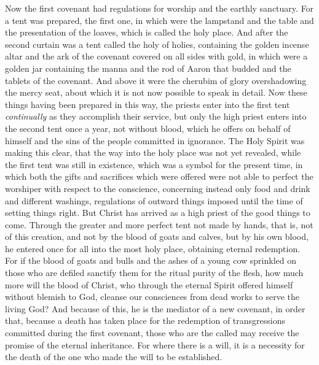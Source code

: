 \begin{biblechapter} %
 Now the first covenant had regulations for worship and the earthly sanctuary.
\verse For a tent was prepared, the first one, in which were the lampstand and the table and the presentation of the loaves, which is called the holy place.
\verse And after the second curtain was a tent called the holy of holies,
\verse containing the golden incense altar and the ark of the covenant covered on all sides with gold, in which were a golden jar containing the manna and the rod of Aaron that budded and the tablets of the covenant.
\verse And above it were the cherubim of glory overshadowing the mercy seat, about which it is not now possible to speak in detail.
\verse Now these things having been prepared in this way, the priests enter into the first tent \textit{continually} as they accomplish their service,
\verse but only the high priest enters into the second tent once a year, not without blood, which he offers on behalf of himself and the sins of the people committed in ignorance.
\verse The Holy Spirit was making this clear, that the way into the holy place was not yet revealed, while the first tent was still in existence,
\verse which was a symbol for the present time, in which both the gifts and sacrifices which were offered were not able to perfect the worshiper with respect to the conscience,
\verse concerning instead only food and drink and different washings, regulations of outward things imposed until the time of setting things right.
 But Christ has arrived as a high priest of the good things to come. Through the greater and more perfect tent not made by hands, that is, not of this creation,
\verse and not by the blood of goats and calves, but by his own blood, he entered once for all into the most holy place, obtaining eternal redemption.
\verse For if the blood of goats and bulls and the ashes of a young cow sprinkled on those who are defiled sanctify them for the ritual purity of the flesh,
\verse how much more will the blood of Christ, who through the eternal Spirit offered himself without blemish to God, cleanse our consciences from dead works to serve the living God?
\verse And because of this, he is the mediator of a new covenant, in order that, because a death has taken place for the redemption of transgressions committed during the first covenant, those who are the called may receive the promise of the eternal inheritance.
\verse For where there is a will, it is a necessity for the death of the one who made the will to be established.

\end{biblechapter}
